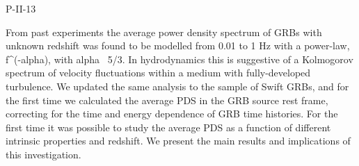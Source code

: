 P-II-13


\bigskip



\bigskip

\noindent From past experiments the average power density spectrum of GRBs with unknown redshift was found to be modelled from 0.01 to 1 Hz with a power-law, f^(-alpha), with alpha ~5/3. In hydrodynamics this is suggestive of a Kolmogorov spectrum of velocity fluctuations within a medium with
fully-developed turbulence. We updated the same analysis to the sample of Swift GRBs, and for the first time we calculated the average PDS in the GRB source rest frame, correcting for the time and energy dependence of GRB time histories.
For the first time it was possible to study the average PDS as a function of different intrinsic properties and redshift.
We present the main results and implications of this investigation.
